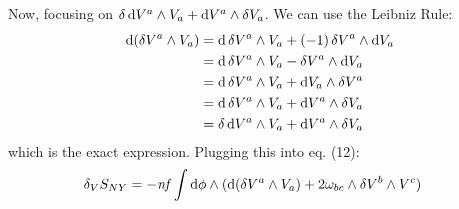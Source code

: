 \documentclass[12pt]{article}
\begin{document}
Now, focusing on $\var{\dd{V^a}} \wedge V_a + \dd V^a \wedge \var{V_a}$. We can use the Leibniz Rule:
\begin{align*}
  \dd(\var{V^a} \wedge V_a) &= \dd{\var{V^a}} \wedge V_a + (-1)\var{V^a} \wedge \dd{V_a} \\
  &= \dd{\var{V^a}} \wedge V_a - \var{V^a} \wedge \dd{V_a} \\
  &= \dd{\var{V^a}} \wedge V_a + \dd{V_a} \wedge \var{V^a} \\
  &= \dd{\var{V^a}} \wedge V_a + \dd{V^a} \wedge \var{V_a} \\
  &= \var{\dd{V^a}} \wedge V_a + \dd{V^a} \wedge \var{V_a}
\end{align*}
which is the exact expression. Plugging this into eq. (12):
\begin{align*}
  \var_V{S_{NY}} &= -\mathit{nf}\int \dd\phi \wedge (\dd(\var{V^a} \wedge V_a) + 2\omega_{bc} \wedge \var{V^b} \wedge V^c)
\end{align*}
\end{document}
